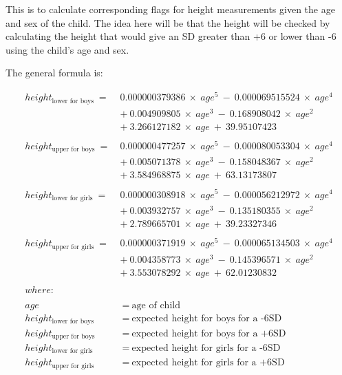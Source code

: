 \documentclass[12pt,a4paper]{article}
\theoremstyle{definition}
\theoremstyle{definition}
\theoremstyle{definition}
\theoremstyle{remark}
\begin{document}
This is to calculate corresponding flags for height measurements given
the age and sex of the child. The idea here will be that the height will
be checked by calculating the height that would give an SD greater than
+6 or lower than -6 using the child's age and sex.

The general formula is:

\[\begin{aligned}
height_\text{lower for boys} ~ = ~ & 0.000000379386 ~ \times ~ age ^ 5 ~ - ~ 0.000069515524 ~ \times ~ age ^ 4 \\
& + ~ 0.004909805 ~ \times ~ age ^ 3 ~ - ~ 0.168908042 ~ \times ~ age ^ 2 \\
& + ~ 3.266127182 ~ \times ~ age ~ + ~ 39.95107423 \\
\\
height_\text{upper for boys} ~ = ~ & 0.000000477257 ~ \times ~ age ^ 5 ~ - ~ 0.000080053304 ~ \times ~ age ^ 4 \\
& + ~ 0.005071378 ~ \times ~ age ^ 3 ~ - ~ 0.158048367 ~ \times ~ age ^ 2 \\
& + ~ 3.584968875 ~ \times ~ age ~ + ~ 63.13173807 \\
\\
height_\text{lower for girls} ~ = ~ & 0.000000308918 ~ \times ~ age ^ 5 ~ - ~ 0.000056212972 ~ \times ~ age ^ 4 \\
& + ~ 0.003932757 ~ \times ~ age ^ 3 ~ - ~ 0.135180355 ~ \times ~ age ^ 2 \\
& + ~ 2.789665701 ~ \times ~ age ~ + ~ 39.23327346 \\
\\
height_\text{upper for girls} ~ = ~ & 0.000000371919 ~ \times ~ age ^ 5 ~ - ~ 0.000065134503 ~ \times ~ age ^ 4 \\
& + ~ 0.004358773 ~ \times ~ age ^ 3 ~ - ~ 0.145396571 ~ \times ~ age ^ 2 \\
& + ~ 3.553078292 ~ \times ~ age ~ + ~ 62.01230832 \\
\\
where: & \\
\\
age & ~ = ~ \text{age of child} \\
height_\text{lower for boys} & ~ = ~ \text{expected height for boys for a -6SD} \\
height_\text{upper for boys} & ~ = ~ \text{expected height for boys for a +6SD} \\
height_\text{lower for girls} & ~ = ~ \text{expected height for girls for a -6SD} \\
height_\text{upper for girls} & ~ = ~ \text{expected height for girls for a +6SD}
\end{aligned}\]
\end{document}
